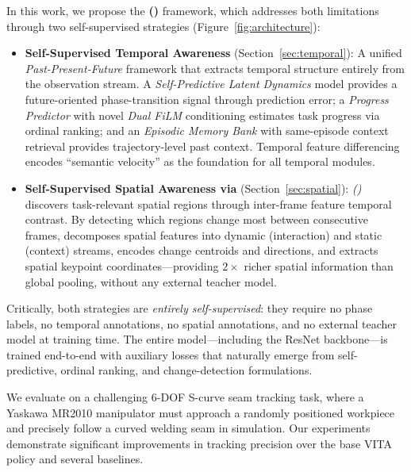 In this work, we propose the \textbf{\methodfull{} (\method{})} framework, which addresses both limitations through two self-supervised strategies (Figure~\ref{fig:architecture}):

\begin{itemize}[leftmargin=*,itemsep=4pt]
    \item \textbf{Self-Supervised Temporal Awareness} (Section~\ref{sec:temporal}): A unified \emph{Past-Present-Future} framework that extracts temporal structure entirely from the observation stream. A \emph{Self-Predictive Latent Dynamics} model provides a future-oriented phase-transition signal through prediction error; a \emph{Progress Predictor} with novel \emph{Dual FiLM} conditioning estimates task progress via ordinal ranking; and an \emph{Episodic Memory Bank} with same-episode context retrieval provides trajectory-level past context. Temporal feature differencing encodes ``semantic velocity'' as the foundation for all temporal modules.

    \item \textbf{Self-Supervised Spatial Awareness via \fasa{}} (Section~\ref{sec:spatial}): \emph{\fasafull{} (\fasa{})} discovers task-relevant spatial regions through inter-frame feature temporal contrast. By detecting which regions change most between consecutive frames, \fasa{} decomposes spatial features into dynamic (interaction) and static (context) streams, encodes change centroids and directions, and extracts spatial keypoint coordinates---providing $2\times$ richer spatial information than global pooling, without any external teacher model.
\end{itemize}

Critically, both strategies are \emph{entirely self-supervised}: they require no phase labels, no temporal annotations, no spatial annotations, and no external teacher model at training time. The entire model---including the ResNet backbone---is trained end-to-end with auxiliary losses that naturally emerge from self-predictive, ordinal ranking, and change-detection formulations.

We evaluate \method{} on a challenging 6-DOF S-curve seam tracking task, where a Yaskawa MR2010 manipulator must approach a randomly positioned workpiece and precisely follow a curved welding seam in simulation. Our experiments demonstrate significant improvements in tracking precision over the base VITA policy and several baselines.

